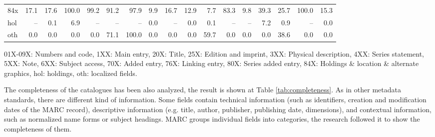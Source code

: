 {\begin{landscape}
\begin{table*}
\begin{minipage}{\columnwidth}
\begin{center}
\begin{tabular}{lrrrrrrrrrrrrrrrr}
84x & 17.1 & 17.6 & 100.0 & 99.2 & 91.2 & 97.9 & 9.9 & 16.7 & 12.9 & 7.7 & 83.3 & 9.8 & 39.3 & 25.7 & 100.0 & 15.3 \\
hol & -- & 0.1 & 6.9 & -- & -- & -- & 0.0 & -- & 0.0 & 0.1 & -- & -- & 7.2 & 0.9 & -- & 0.0 \\
oth & 0.0 & 0.0 & 0.0 & 0.0 & 71.1 & 100.0 & 0.0 & 0.0 & 0.0 & 59.7 & 0.0 & 0.0 & 0.0 & 38.6 & 0.0 & 0.0 \\
\bottomrule
\end{tabular}
\end{center}
\footnotesize
01X-09X: Numbers and code, 1XX: Main entry, 20X: Title, 25X: Edition and imprint, 3XX: Physical description, 4XX: Series statement, 5XX: Note, 6XX: Subject access, 70X: Added entry, 76X: Linking entry, 80X: Series added entry, 84X: Holdings \& location \& alternate graphics, hol: holdings, oth: localized fields.
\end{minipage}
\end{table*}
    \end{landscape}
    \clearpage%
}

The completeness of the catalogues has been also analyzed, the result is shown at Table \ref{tab:completeness}. As in other metadata standards, there are different kind of information. Some fields contain technical information (such as identifiers, creation and modification dates of the MARC record), descriptive information (e.g. title, author, publisher, publishing date, dimensions), and contextual information, such as normalized name forms or subject headings. MARC groups individual fields into categories, the research followed it to show the completeness of them.

